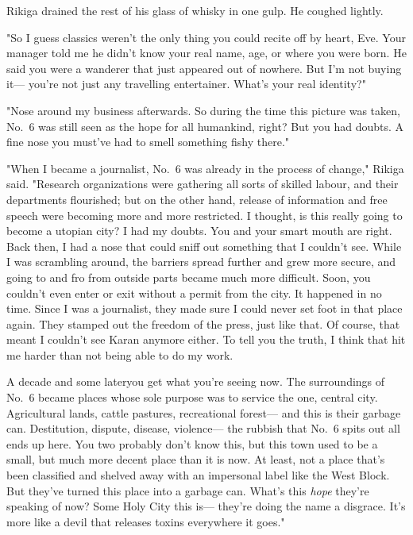 Rikiga drained the rest of his glass of whisky in one gulp. He coughed
lightly.

"So I guess classics weren't the only thing you could recite off by
heart, Eve. Your manager told me he didn't know your real name, age, or
where you were born. He said you were a wanderer that just appeared out
of nowhere. But I'm not buying it--- you're not just any travelling
entertainer. What's your real identity?"

"Nose around my business afterwards. So during the time this picture was
taken, No.~6 was still seen as the hope for all humankind, right? But
you had doubts. A fine nose you must've had to smell something fishy
there."

"When I became a journalist, No.~6 was already in the process of
change," Rikiga said. "Research organizations were gathering all sorts
of skilled labour, and their departments flourished; but on the other
hand, release of information and free speech were becoming more and more
restricted. I thought, is this really going to become a utopian city? I
had my doubts. You and your smart mouth are right. Back then, I had a
nose that could sniff out something that I couldn't see. While I was
scrambling around, the barriers spread further and grew more secure, and
going to and fro from outside parts became much more difficult. Soon,
you couldn't even enter or exit without a permit from the city. It
happened in no time. Since I was a journalist, they made sure I could
never set foot in that place again. They stamped out the freedom of the
press, just like that. Of course, that meant I couldn't see Karan
anymore either. To tell you the truth, I think that hit me harder than
not being able to do my work.

A decade and some later\el you get what you're seeing now. The
surroundings of No.~6 became places whose sole purpose was to service
the one, central city. Agricultural lands, cattle pastures, recreational
forest--- and this is their garbage can. Destitution, dispute, disease,
violence--- the rubbish that No.~6 spits out all ends up here. You two
probably don't know this, but this town used to be a small, but much
more decent place than it is now. At least, not a place that's been
classified and shelved away with an impersonal label like the West
Block. But they've turned this place into a garbage can. What's this
\emph{hope} they're speaking of now? Some Holy City this is--- they're doing the
name a disgrace. It's more like a devil that releases toxins everywhere
it goes."

